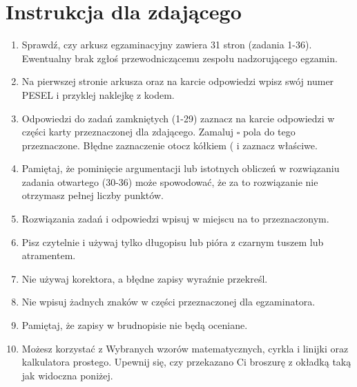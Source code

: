 \documentclass[10pt]{article}
\begin{document}
\section*{Instrukcja dla zdającego}
\begin{enumerate}
  \item Sprawdź, czy arkusz egzaminacyjny zawiera 31 stron (zadania 1-36). Ewentualny brak zgłoś przewodniczącemu zespołu nadzorującego egzamin.
  \item Na pierwszej stronie arkusza oraz na karcie odpowiedzi wpisz swój numer PESEL i przyklej naklejkę z kodem.
  \item Odpowiedzi do zadań zamkniętych (1-29) zaznacz na karcie odpowiedzi w części karty przeznaczonej dla zdającego. Zamaluj \(\square\) pola do tego przeznaczone. Błędne zaznaczenie otocz kółkiem ( i zaznacz właściwe.
  \item Pamiętaj, że pominięcie argumentacji lub istotnych obliczeń w rozwiązaniu zadania otwartego (30-36) może spowodować, że za to rozwiązanie nie otrzymasz pełnej liczby punktów.
  \item Rozwiązania zadań i odpowiedzi wpisuj w miejscu na to przeznaczonym.
  \item Pisz czytelnie i używaj tylko długopisu lub pióra z czarnym tuszem lub atramentem.
  \item Nie używaj korektora, a błędne zapisy wyraźnie przekreśl.
  \item Nie wpisuj żadnych znaków w części przeznaczonej dla egzaminatora.
  \item Pamiętaj, że zapisy w brudnopisie nie będą oceniane.
  \item Możesz korzystać z Wybranych wzorów matematycznych, cyrkla i linijki oraz kalkulatora prostego. Upewnij się, czy przekazano Ci broszurę z okładką taką jak widoczna poniżej.\\

\end{enumerate}
\end{document}

